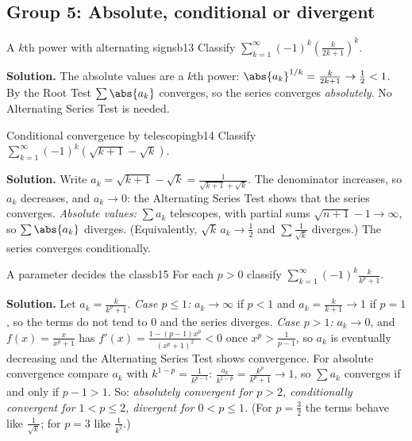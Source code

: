 \documentclass[11pt]{article}
\begin{document}
\subsection*{Group 5: Absolute, conditional or divergent}

\begin{exmp}{A $k$th power with alternating signs}{b13}
Classify $\displaystyle\sum_{k=1}^\infty(-1)^k\left(\frac k{2k+1}\right)^k$.

\textbf{Solution.} The absolute values are a $k$th power: $\abs{a_k}^{1/k}=\frac k{2k+1}\to\frac12<1$. By the Root Test $\sum\abs{a_k}$ converges, so the series converges \emph{absolutely}. No Alternating Series Test is needed.
\end{exmp}

\begin{exmp}{Conditional convergence by telescoping}{b14}
Classify $\displaystyle\sum_{k=1}^\infty(-1)^k\left(\sqrt{k+1}-\sqrt k\right)$.

\textbf{Solution.} Write $a_k=\sqrt{k+1}-\sqrt k=\frac1{\sqrt{k+1}+\sqrt k}$. The denominator increases, so $a_k$ decreases, and $a_k\to0$: the Alternating Series Test shows that the series converges. \emph{Absolute values:} $\sum a_k$ telescopes, with partial sums $\sqrt{n+1}-1\to\infty$, so $\sum\abs{a_k}$ diverges. (Equivalently, $\sqrt k\,a_k\to\frac12$ and $\sum\frac1{\sqrt k}$ diverges.) The series converges conditionally.
\end{exmp}

\begin{exmp}{A parameter decides the class}{b15}
For each $p>0$ classify $\displaystyle\sum_{k=1}^\infty(-1)^k\frac k{k^p+1}$.

\textbf{Solution.} Let $a_k=\frac k{k^p+1}$. \emph{Case $p\le1$:} $a_k\to\infty$ if $p<1$ and $a_k=\frac k{k+1}\to1$ if $p=1$, so the terms do not tend to $0$ and the series diverges. \emph{Case $p>1$:} $a_k\to0$, and $f(x)=\frac x{x^p+1}$ has $f'(x)=\frac{1-(p-1)x^p}{(x^p+1)^2}<0$ once $x^p>\frac1{p-1}$, so $a_k$ is eventually decreasing and the Alternating Series Test shows convergence. For absolute convergence compare $a_k$ with $k^{1-p}=\frac1{k^{p-1}}$: $\frac{a_k}{k^{1-p}}=\frac{k^p}{k^p+1}\to1$, so $\sum a_k$ converges if and only if $p-1>1$. So: \emph{absolutely convergent for $p>2$, conditionally convergent for $1<p\le2$, divergent for $0<p\le1$.} (For $p=\frac32$ the terms behave like $\frac1{\sqrt k}$; for $p=3$ like $\frac1{k^2}$.)
\end{exmp}
\end{document}
